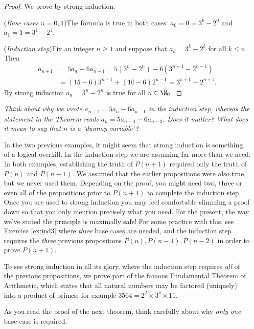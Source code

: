 \begin{proof}
	We prove by strong induction.\par
	(\emph{Base cases} $n=0,1$)\quad The formula is true in both cases: $a_0=0=3^0-2^0$ and $a_1=1=3^1-2^1$.\par
	(\emph{Induction step})\quad Fix an integer $n\ge 1$ and suppose that $a_k=3^k-2^k$ for all $k\le n$. Then
	\begin{align*}
		a_{n+1}&=5a_n-6a_{n-1}=5(3^n-2^n)-6(3^{n-1}-2^{n-1})\\
		&=(15-6)3^{n-1}+(10-6)2^{n-1}=3^{n+1}-2^{n+1}.
	\end{align*}
	By strong induction $a_n=3^n-2^n$ is true for all $n\in\N_0$.
\end{proof}

\emph{Think about why we wrote $a_{n+1}=5a_n-6a_{n-1}$ in the induction step, whereas the statement in the Theorem reads $a_n=5a_{n-1}-6a_{n-2}$. Does it matter? What does it mean to say that $n$ is a `dummy variable'?}\par

In the two previous examples, it might seem that strong induction is something of a logical overkill. In the induction step we are assuming far more than we need. In both examples, establishing the truth of $P(n+1)$ required only the truth of $P(n)$ and $P(n-1)$. We assumed that the earlier propositions were also true, but we never used them. Depending on the proof, you might need two, three or even all of the propositions prior to $P(n+1)$ to complete the induction step. Once you are used to strong induction you may feel comfortable slimming a proof down so that you only mention precisely what you need. For the present, the way we've stated the principle is maximally safe! For some practice with this, see Exercise \ref{ex:ind3} where \emph{three} base cases are needed, and the induction step requires the \emph{three} previous propositions $P(n),P(n-1),P(n-2)$ in order to prove $P(n+1)$.\par

To see strong induction in all its glory, where the induction step requires \emph{all} of the previous propositions, we prove part of the famous Fundamental Theorem of Arithmetic, which states that all natural numbers may be factored (uniquely) into a product of primes: for example $3564=2^2\times 3^4\times 11$.



As you read the proof of the next theorem, think carefully about why \emph{only one} base case is required.

